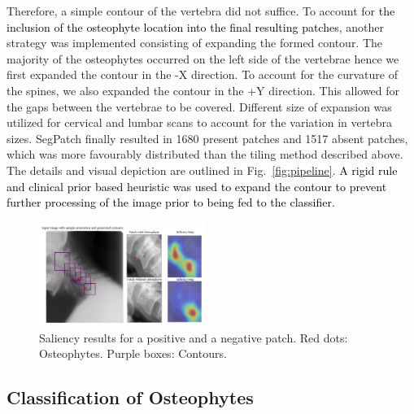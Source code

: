 \documentclass{article}
\newcommand{\final}[1]{\textcolor{black}{#1}}
\begin{document}
Therefore, a simple contour of the vertebra  did not suffice. To account for \final{the inclusion of the osteophyte location into the final resulting patches}, another strategy was implemented consisting of expanding the formed contour. 
The majority of the osteophytes occurred on the left side of the vertebrae hence we first expanded the contour in the -X direction. To account for the curvature of the spines, we also expanded the contour in the +Y direction. This allowed for the gaps between the vertebrae to be covered. Different size of expansion was utilized for cervical and lumbar scans to account for the variation in vertebra sizes. SegPatch finally resulted in 1680 present patches and 1517 absent patches, which was more favourably distributed than the tiling method described above. The details and visual depiction are outlined in Fig.~\ref{fig:pipeline}. \final{A rigid rule and clinical prior based heuristic was used to expand the contour to prevent further processing of the image prior to being fed to the classifier.}

\begin{figure}
    \centering
    \includegraphics[width=0.48\textwidth]{Explainability_Example.png}
    \caption{Saliency results for a positive and a negative patch. Red dots: Osteophytes. Purple boxes: Contours.}
    \label{fig:Explainability}
\end{figure}

\subsection{Classification of Osteophytes}
\label{sec:patch_classification}
\end{document}
